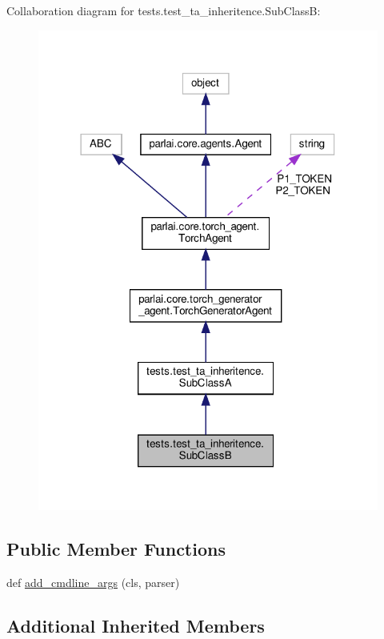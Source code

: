 Collaboration diagram for tests.\+test\+\_\+ta\+\_\+inheritence.\+Sub\+ClassB\+:
\nopagebreak
\begin{figure}[H]
\begin{center}
\leavevmode
\includegraphics[width=318pt]{dd/df5/classtests_1_1test__ta__inheritence_1_1SubClassB__coll__graph}
\end{center}
\end{figure}
\subsection*{Public Member Functions}
\begin{DoxyCompactItemize}
\item 
def \hyperlink{classtests_1_1test__ta__inheritence_1_1SubClassB_a9aa7384116305903fbf530d4710e83a3}{add\+\_\+cmdline\+\_\+args} (cls, parser)
\end{DoxyCompactItemize}
\subsection*{Additional Inherited Members}


